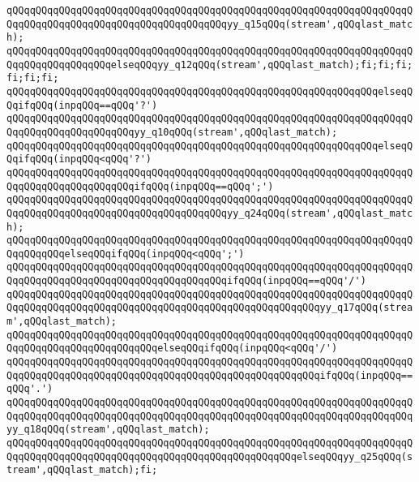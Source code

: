 \verb|qQQqqQQqqQQqqQQqqQQqqQQqqQQqqQQqqQQqqQQqqQQqqQQqqQQqqQQqqQQqqQQqqQQqqQQqqQQqqQQqqQQqqQQqqQQqqQQqqQQqqQQqqQQqyy_q15qQQq(stream',qQQqlast_match);|\newline
\verb|qQQqqQQqqQQqqQQqqQQqqQQqqQQqqQQqqQQqqQQqqQQqqQQqqQQqqQQqqQQqqQQqqQQqqQQqqQQqqQQqqQQqqQQqelseqQQqyy_q12qQQq(stream',qQQqlast_match);fi;fi;fi;fi;fi;fi;|\newline
\verb|qQQqqQQqqQQqqQQqqQQqqQQqqQQqqQQqqQQqqQQqqQQqqQQqqQQqqQQqqQQqqQQqelseqQQqifqQQq(inpqQQq==qQQq'?')|\newline
\verb|qQQqqQQqqQQqqQQqqQQqqQQqqQQqqQQqqQQqqQQqqQQqqQQqqQQqqQQqqQQqqQQqqQQqqQQqqQQqqQQqqQQqqQQqqQQqyy_q10qQQq(stream',qQQqlast_match);|\newline
\verb|qQQqqQQqqQQqqQQqqQQqqQQqqQQqqQQqqQQqqQQqqQQqqQQqqQQqqQQqqQQqqQQqelseqQQqifqQQq(inpqQQq<qQQq'?')|\newline
\verb|qQQqqQQqqQQqqQQqqQQqqQQqqQQqqQQqqQQqqQQqqQQqqQQqqQQqqQQqqQQqqQQqqQQqqQQqqQQqqQQqqQQqqQQqqQQqifqQQq(inpqQQq==qQQq';')|\newline
\verb|qQQqqQQqqQQqqQQqqQQqqQQqqQQqqQQqqQQqqQQqqQQqqQQqqQQqqQQqqQQqqQQqqQQqqQQqqQQqqQQqqQQqqQQqqQQqqQQqqQQqqQQqqQQqyy_q24qQQq(stream',qQQqlast_match);|\newline
\verb|qQQqqQQqqQQqqQQqqQQqqQQqqQQqqQQqqQQqqQQqqQQqqQQqqQQqqQQqqQQqqQQqqQQqqQQqqQQqqQQqelseqQQqifqQQq(inpqQQq<qQQq';')|\newline
\verb|qQQqqQQqqQQqqQQqqQQqqQQqqQQqqQQqqQQqqQQqqQQqqQQqqQQqqQQqqQQqqQQqqQQqqQQqqQQqqQQqqQQqqQQqqQQqqQQqqQQqqQQqqQQqifqQQq(inpqQQq==qQQq'/')|\newline
\verb|qQQqqQQqqQQqqQQqqQQqqQQqqQQqqQQqqQQqqQQqqQQqqQQqqQQqqQQqqQQqqQQqqQQqqQQqqQQqqQQqqQQqqQQqqQQqqQQqqQQqqQQqqQQqqQQqqQQqqQQqqQQqyy_q17qQQq(stream',qQQqlast_match);|\newline
\verb|qQQqqQQqqQQqqQQqqQQqqQQqqQQqqQQqqQQqqQQqqQQqqQQqqQQqqQQqqQQqqQQqqQQqqQQqqQQqqQQqqQQqqQQqqQQqqQQqelseqQQqifqQQq(inpqQQq<qQQq'/')|\newline
\verb|qQQqqQQqqQQqqQQqqQQqqQQqqQQqqQQqqQQqqQQqqQQqqQQqqQQqqQQqqQQqqQQqqQQqqQQqqQQqqQQqqQQqqQQqqQQqqQQqqQQqqQQqqQQqqQQqqQQqqQQqqQQqifqQQq(inpqQQq==qQQq'.')|\newline
\verb|qQQqqQQqqQQqqQQqqQQqqQQqqQQqqQQqqQQqqQQqqQQqqQQqqQQqqQQqqQQqqQQqqQQqqQQqqQQqqQQqqQQqqQQqqQQqqQQqqQQqqQQqqQQqqQQqqQQqqQQqqQQqqQQqqQQqqQQqqQQqyy_q18qQQq(stream',qQQqlast_match);|\newline
\verb|qQQqqQQqqQQqqQQqqQQqqQQqqQQqqQQqqQQqqQQqqQQqqQQqqQQqqQQqqQQqqQQqqQQqqQQqqQQqqQQqqQQqqQQqqQQqqQQqqQQqqQQqqQQqqQQqqQQqqQQqelseqQQqyy_q25qQQq(stream',qQQqlast_match);fi;|\newline
